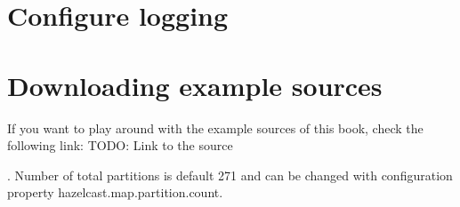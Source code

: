 \section{Configure logging}

\section{Downloading example sources}
If you want to play around with the example sources of this book, check the following link:
TODO: Link to the source

. Number of total partitions is default 271 and can be changed with configuration property hazelcast.map.partition.count. 
